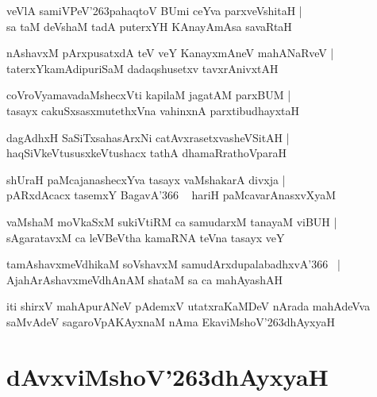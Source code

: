 \documentclass[twoside,12pt,openright]{book}
\def\S{\char'263}
\newcounter{shloka}[chapter]
\begin{document}
\begin{shloka}%
veVlA samiVPeV\S pahaqtoV BUmi ceYva parxveVshitaH |\\
sa taM deVshaM tadA puterxYH KAnayAmAsa savaRtaH 
\end{shloka}

\begin{shloka}%
nAshavxM pArxpusatxdA teV veY KanayxmAneV mahANaRveV |\\
taterxYkamAdipuriSaM dadaqshusetxv tavxrAnivxtAH
\end{shloka}

\begin{shloka}%
coVroVyamavadaMshecxVti kapilaM jagatAM parxBUM |\\
tasayx cakuSxsasxmutethxVna vahinxnA parxtibudhayxtaH 
\end{shloka}

\begin{shloka}%
dagAdhxH SaSiTxsahasArxNi catAvxrasetxvasheVSitAH |\\
haqSiVkeVtususxkeVtushacx tathA dhamaRrathoVparaH 
\end{shloka}

\begin{shloka}%
shUraH paMcajanashecxYva tasayx vaMshakarA divxja |\\
pARxdAcacx tasemxY BagavA\char'366 ~ hariH paMcavarAnasxvXyaM 
\end{shloka}

\begin{shloka}%
vaMshaM moVkaSxM sukiVtiRM ca samudarxM tanayaM viBUH |\\
sAgaratavxM ca leVBeVtha kamaRNA teVna tasayx veY
\end{shloka}

\begin{shloka}%
tamAshavxmeVdhikaM soVshavxM samudArxdupalabadhxvA\char'366 ~|\\
AjahArAshavxmeVdhAnAM shataM sa ca mahAyashAH
\end{shloka}

\begin{center}
iti shirxV mahApurANeV pAdemxV utatxraKaMDeV  nArada mahAdeVva saMvAdeV sagaroVpAKAyxnaM 
nAma EkaviMshoV\S dhAyxyaH 
\end{center}

\chapter{dAvxviMshoV\S dhAyxyaH}
\end{document}

